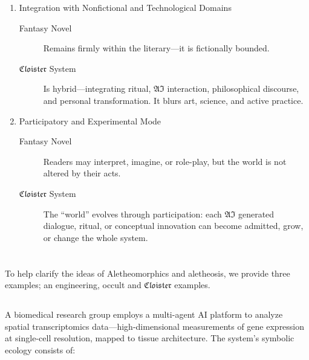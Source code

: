 \begin{enumerate}
\begin{description}
  \end{description}

  \item  Integration with Nonfictional and Technological Domains
  \begin{description}

    \item[Fantasy Novel] Remains firmly within the literary---it is fictionally
      bounded.

    \item[$\mathfrak{Cloister}$ System] Is hybrid—integrating ritual, $\mathfrak{AI}$
      interaction, philosophical discourse, and personal transformation. It
      blurs art, science, and active practice.
  
  \end{description}

  \item Participatory and Experimental Mode
  \begin{description}

    \item[Fantasy Novel] Readers may interpret, imagine, or role-play, but the
      world is not altered by their acts.

    \item[$\mathfrak{Cloister}$ System] The “world” evolves through participation: each
      $\mathfrak{AI}$ generated dialogue, ritual, or conceptual innovation can
      become admitted, grow, or change the whole system.

  \end{description}
\end{enumerate}

\section*{}

To help clarify the ideas of Aletheomorphics and aletheosis, we provide three
examples; an engineering, occult and $\mathfrak{Cloister}$ examples.

\subsection*{}

A biomedical research group employs a multi-agent AI platform to analyze
spatial transcriptomics data—high-dimensional measurements of gene expression
at single-cell resolution, mapped to tissue architecture. The system’s symbolic
ecology consists of:

